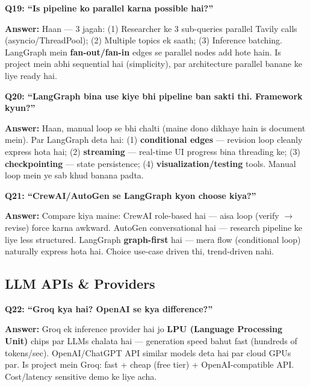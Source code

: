 \begin{interviewbox}
\textbf{Q19: ``Is pipeline ko parallel karna possible hai?''}

\textbf{Answer:} Haan --- 3 jagah: (1) Researcher ke 3 sub-queries parallel Tavily calls (asyncio/ThreadPool); (2) Multiple topics ek saath; (3) Inference batching. LangGraph mein \textbf{fan-out/fan-in} edges se parallel nodes add hote hain. Is project mein abhi sequential hai (simplicity), par architecture parallel banane ke liye ready hai.
\end{interviewbox}

\begin{interviewbox}
\textbf{Q20: ``LangGraph bina use kiye bhi pipeline ban sakti thi. Framework kyun?''}

\textbf{Answer:} Haan, manual loop se bhi chalti (maine dono dikhaye hain is document mein). Par LangGraph deta hai: (1) \textbf{conditional edges} --- revision loop cleanly express hota hai; (2) \textbf{streaming} --- real-time UI progress bina threading ke; (3) \textbf{checkpointing} --- state persistence; (4) \textbf{visualization/testing} tools. Manual loop mein ye sab khud banana padta.
\end{interviewbox}

\begin{interviewbox}
\textbf{Q21: ``CrewAI/AutoGen se LangGraph kyon choose kiya?''}

\textbf{Answer:} Compare kiya maine: CrewAI role-based hai --- aisa loop (verify $\rightarrow$ revise) force karna awkward. AutoGen conversational hai --- research pipeline ke liye less structured. LangGraph \textbf{graph-first} hai --- mera flow (conditional loop) naturally express hota hai. Choice use-case driven thi, trend-driven nahi.
\end{interviewbox}

\subsection{LLM APIs \& Providers}

\begin{interviewbox}
\textbf{Q22: ``Groq kya hai? OpenAI se kya difference?''}

\textbf{Answer:} Groq ek inference provider hai jo \textbf{LPU (Language Processing Unit)} chips par LLMs chalata hai --- generation speed bahut fast (hundreds of tokens/sec). OpenAI/ChatGPT API similar models deta hai par cloud GPUs par. Is project mein Groq: fast + cheap (free tier) + OpenAI-compatible API. Cost/latency sensitive demo ke liye acha.
\end{interviewbox}


